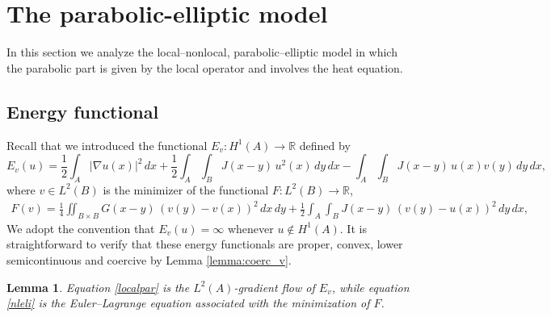 \documentclass[reqno]{amsart}
\numberwithin{equation}{section}
\newtheorem{lemma}[theorem]{Lemma}
\begin{document}
\section{The parabolic-elliptic model} \label{sect-1-model}

In this section we analyze the local--nonlocal, parabolic--elliptic model in which the parabolic part 
is given by the local operator and involves the heat equation. 

\subsection{Energy functional} \label{subsection.energy}

Recall that we introduced the functional $E_v : H^1(A) \to \mathbb{R}$ defined by
\[
E_v(u)
= \frac12\int_A |\nabla u(x)|^2\,dx
  + \frac12\int_A\int_B J(x-y)\,u^2 (x)\,dy\,dx
  - \int_A\int_B J(x-y)\,u(x)v(y)\,dy\,dx,
\]
where \(v \in L^2(B)\) is the minimizer of the functional \(F : L^2(B)\to \mathbb{R}\),
\begin{align}\label{min-v}
F(v)
= \frac14 \iint_{B\times B} G(x-y)\,(v(y)-v(x))^2\,dx\,dy
  + \frac12\int_A\int_B J(x-y)\,(v(y)-u(x))^2\,dy\,dx,
\end{align}
We adopt the convention that $E_v(u)=\infty$ whenever $u \notin H^1(A)$. It is straightforward to verify that these energy functionals are proper, convex, lower semicontinuous and coercive by Lemma \ref{lemma:coerc_v}. 

\begin{lemma} \label{lemma.energia}
Equation \eqref{localpar} is the \(L^2(A)\)-gradient flow of \(E_v\), while equation \eqref{nleli} is the Euler--Lagrange equation associated with the minimization of \(F\). 
\end{lemma}
\end{document}
